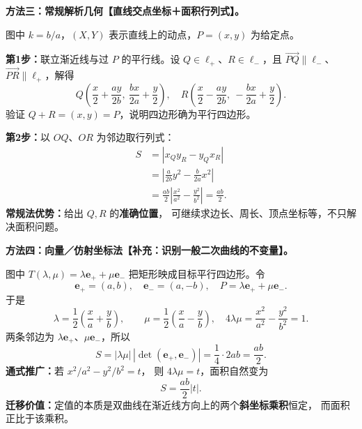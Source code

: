 \clearpage
\begin{proofbox}
\textbf{方法三：常规解析几何【直线交点坐标＋面积行列式】。}

图中 $k=b/a$，$(X,Y)$ 表示直线上的动点，$P=(x,y)$ 为给定点。

\begin{center}

\end{center}

\textbf{第1步：}联立渐近线与过 $P$ 的平行线。设
$Q\in\ell_+$、$R\in\ell_-$，且 $\overrightarrow{PQ}\parallel\ell_-$、
$\overrightarrow{PR}\parallel\ell_+$，解得
\[
\boxed{Q\left(\frac{x}{2}+\frac{ay}{2b},\ \frac{bx}{2a}+\frac y2\right)},
\quad
\boxed{R\left(\frac{x}{2}-\frac{ay}{2b},\ -\frac{bx}{2a}+\frac y2\right)}.
\]
验证 $Q+R=(x,y)=P$，说明四边形确为平行四边形。

\textbf{第2步：}以 $OQ$、$OR$ 为邻边取行列式：
\[
\begin{aligned}
S&=|x_Qy_R-y_Qx_R|\\
 &=\left|\frac{a}{2b}y^2-\frac{b}{2a}x^2\right|\\
 &=\frac{ab}{2}\left|\frac{x^2}{a^2}-\frac{y^2}{b^2}\right|
 =\boxed{\frac{ab}{2}}.
\end{aligned}
\]
\textbf{常规法优势：}给出 $Q,R$ 的\textbf{准确位置}，
可继续求边长、周长、顶点坐标等，不只解决面积问题。
\end{proofbox}

\clearpage
\begin{proofbox}
\textbf{方法四：向量／仿射坐标法【补充：识别一般二次曲线的不变量】。}

\begin{center}

\end{center}

图中 $T(\lambda,\mu)=\lambda\mathbf e_++\mu\mathbf e_-$ 把矩形映成目标平行四边形。令
\[
\mathbf e_+=(a,b),\quad\mathbf e_-=(a,-b),\quad
P=\lambda\mathbf e_++\mu\mathbf e_-.
\]
于是
\[
\lambda=\frac12\left(\frac xa+\frac yb\right),\qquad
\mu=\frac12\left(\frac xa-\frac yb\right),
\quad 4\lambda\mu=\frac{x^2}{a^2}-\frac{y^2}{b^2}=1.
\]
两条邻边为 $\lambda\mathbf e_+$、$\mu\mathbf e_-$，所以
\[
S=|\lambda\mu|\,|\det(\mathbf e_+,\mathbf e_-)|
=\frac14\cdot 2ab=\boxed{\frac{ab}{2}}.
\]
\textbf{通式推广：}若 $x^2/a^2-y^2/b^2=t$，
则 $4\lambda\mu=t$，面积自然变为
\[
\boxed{S=\frac{ab}{2}|t|}.
\]
\textbf{迁移价值：}定值的本质是双曲线在渐近线方向上的两个\textbf{斜坐标乘积}恒定，
而面积正比于该乘积。
\end{proofbox}



